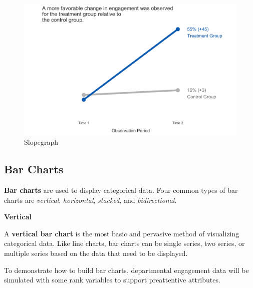 \documentclass[
]{book}
\begin{document}
\begin{figure}

{\centering \includegraphics[width=1\linewidth]{graphics/slopegraph} 

}

\caption{Slopegraph}\label{fig:slopegraph}
\end{figure}

\hypertarget{bar-charts}{%
\subsection{Bar Charts}\label{bar-charts}}

\textbf{Bar charts} are used to display categorical data. Four common types of bar charts are \emph{vertical}, \emph{horizontal}, \emph{stacked}, and \emph{bidirectional}.

\textbf{Vertical}

A \textbf{vertical bar chart} is the most basic and pervasive method of visualizing categorical data. Like line charts, bar charts can be single series, two series, or multiple series based on the data that need to be displayed.

To demonstrate how to build bar charts, departmental engagement data will be simulated with some rank variables to support preattentive attributes.
\end{document}
